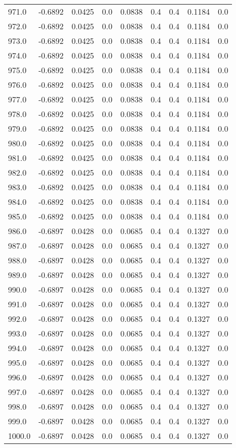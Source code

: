 \begin{longtable}{lrrrrrrrr}
971.0 & -0.6892 & 0.0425 & 0.0 & 0.0838 & 0.4 & 0.4 & 0.1184 & 0.0 \\
972.0 & -0.6892 & 0.0425 & 0.0 & 0.0838 & 0.4 & 0.4 & 0.1184 & 0.0 \\
973.0 & -0.6892 & 0.0425 & 0.0 & 0.0838 & 0.4 & 0.4 & 0.1184 & 0.0 \\
974.0 & -0.6892 & 0.0425 & 0.0 & 0.0838 & 0.4 & 0.4 & 0.1184 & 0.0 \\
975.0 & -0.6892 & 0.0425 & 0.0 & 0.0838 & 0.4 & 0.4 & 0.1184 & 0.0 \\
976.0 & -0.6892 & 0.0425 & 0.0 & 0.0838 & 0.4 & 0.4 & 0.1184 & 0.0 \\
977.0 & -0.6892 & 0.0425 & 0.0 & 0.0838 & 0.4 & 0.4 & 0.1184 & 0.0 \\
978.0 & -0.6892 & 0.0425 & 0.0 & 0.0838 & 0.4 & 0.4 & 0.1184 & 0.0 \\
979.0 & -0.6892 & 0.0425 & 0.0 & 0.0838 & 0.4 & 0.4 & 0.1184 & 0.0 \\
980.0 & -0.6892 & 0.0425 & 0.0 & 0.0838 & 0.4 & 0.4 & 0.1184 & 0.0 \\
981.0 & -0.6892 & 0.0425 & 0.0 & 0.0838 & 0.4 & 0.4 & 0.1184 & 0.0 \\
982.0 & -0.6892 & 0.0425 & 0.0 & 0.0838 & 0.4 & 0.4 & 0.1184 & 0.0 \\
983.0 & -0.6892 & 0.0425 & 0.0 & 0.0838 & 0.4 & 0.4 & 0.1184 & 0.0 \\
984.0 & -0.6892 & 0.0425 & 0.0 & 0.0838 & 0.4 & 0.4 & 0.1184 & 0.0 \\
985.0 & -0.6892 & 0.0425 & 0.0 & 0.0838 & 0.4 & 0.4 & 0.1184 & 0.0 \\
986.0 & -0.6897 & 0.0428 & 0.0 & 0.0685 & 0.4 & 0.4 & 0.1327 & 0.0 \\
987.0 & -0.6897 & 0.0428 & 0.0 & 0.0685 & 0.4 & 0.4 & 0.1327 & 0.0 \\
988.0 & -0.6897 & 0.0428 & 0.0 & 0.0685 & 0.4 & 0.4 & 0.1327 & 0.0 \\
989.0 & -0.6897 & 0.0428 & 0.0 & 0.0685 & 0.4 & 0.4 & 0.1327 & 0.0 \\
990.0 & -0.6897 & 0.0428 & 0.0 & 0.0685 & 0.4 & 0.4 & 0.1327 & 0.0 \\
991.0 & -0.6897 & 0.0428 & 0.0 & 0.0685 & 0.4 & 0.4 & 0.1327 & 0.0 \\
992.0 & -0.6897 & 0.0428 & 0.0 & 0.0685 & 0.4 & 0.4 & 0.1327 & 0.0 \\
993.0 & -0.6897 & 0.0428 & 0.0 & 0.0685 & 0.4 & 0.4 & 0.1327 & 0.0 \\
994.0 & -0.6897 & 0.0428 & 0.0 & 0.0685 & 0.4 & 0.4 & 0.1327 & 0.0 \\
995.0 & -0.6897 & 0.0428 & 0.0 & 0.0685 & 0.4 & 0.4 & 0.1327 & 0.0 \\
996.0 & -0.6897 & 0.0428 & 0.0 & 0.0685 & 0.4 & 0.4 & 0.1327 & 0.0 \\
997.0 & -0.6897 & 0.0428 & 0.0 & 0.0685 & 0.4 & 0.4 & 0.1327 & 0.0 \\
998.0 & -0.6897 & 0.0428 & 0.0 & 0.0685 & 0.4 & 0.4 & 0.1327 & 0.0 \\
999.0 & -0.6897 & 0.0428 & 0.0 & 0.0685 & 0.4 & 0.4 & 0.1327 & 0.0 \\
1000.0 & -0.6897 & 0.0428 & 0.0 & 0.0685 & 0.4 & 0.4 & 0.1327 & 0.0 \\
\end{longtable}